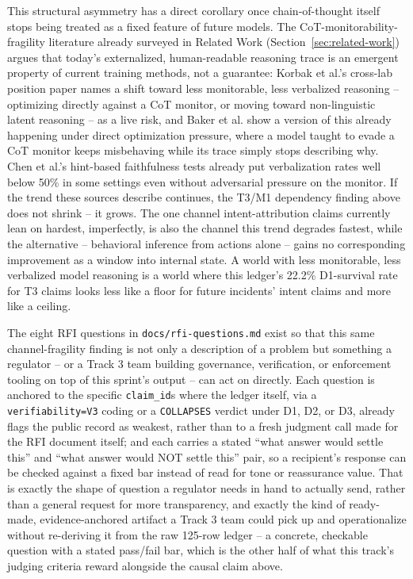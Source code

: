 This structural asymmetry has a direct corollary once chain-of-thought
itself stops being treated as a fixed feature of future models. The
CoT-monitorability-fragility literature already surveyed in Related Work
(Section~\ref{sec:related-work}) argues that today's externalized,
human-readable reasoning trace is an emergent property of current training
methods, not a guarantee: Korbak et al.'s cross-lab position paper names a
shift toward less monitorable, less verbalized reasoning -- optimizing
directly against a CoT monitor, or moving toward non-linguistic latent
reasoning -- as a live risk, and Baker et al. show a version of this already
happening under direct optimization pressure, where a model taught to evade
a CoT monitor keeps misbehaving while its trace simply stops describing why.
Chen et al.'s hint-based faithfulness tests already put verbalization rates
well below 50\% in some settings even without adversarial pressure on the
monitor. If the trend these sources describe continues, the T3/M1 dependency
finding above does not shrink -- it grows. The one channel intent-attribution
claims currently lean on hardest, imperfectly, is also the channel this
trend degrades fastest, while the alternative -- behavioral inference from
actions alone -- gains no corresponding improvement as a window into internal
state. A world with less monitorable, less verbalized model reasoning is a
world where this ledger's 22.2\% D1-survival rate for T3 claims looks less
like a floor for future incidents' intent claims and more like a ceiling.

The eight RFI questions in \texttt{docs/rfi-questions.md} exist so that this
same channel-fragility finding is not only a description of a problem but
something a regulator -- or a Track 3 team building governance,
verification, or enforcement tooling on top of this sprint's output -- can
act on directly. Each question is anchored to the specific \texttt{claim\_id}s
where the ledger itself, via a \texttt{verifiability=V3} coding or a
\texttt{COLLAPSES} verdict under D1, D2, or D3, already flags the public
record as weakest, rather than to a fresh judgment call made for the RFI
document itself; and each carries a stated ``what answer would settle this''
and ``what answer would NOT settle this'' pair, so a recipient's response can
be checked against a fixed bar instead of read for tone or reassurance
value. That is exactly the shape of question a regulator needs in hand to
actually send, rather than a general request for more transparency, and
exactly the kind of ready-made, evidence-anchored artifact a Track 3 team
could pick up and operationalize without re-deriving it from the raw
125-row ledger -- a concrete, checkable question with a stated pass/fail
bar, which is the other half of what this track's judging criteria reward
alongside the causal claim above.

